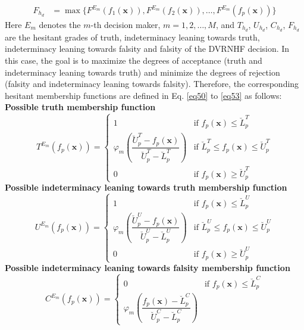 \documentclass[a4paper]{elsarticle}
\begin{document}
{\begin{align}
\label{eq49}
F_{h_{d}} &= \max\{ F^{E_m}(f_1(\mathbf{x})), F^{E_m}(f_2(\mathbf{x})), \ldots, F^{E_m}(f_p(\mathbf{x})) \}
\end{align}
Here $E_m$ denotes the $m$-th decision maker, $m = 1,2,\ldots,M$, and $T_{h_d}$, $U_{h_d}$, $C_{h_d}$, $F_{h_d}$ are the hesitant grades of truth, indeterminacy leaning towards truth, indeterminacy leaning towards falsity and falsity of the DVRNHF decision. In this case, the goal is to maximize the degrees of acceptance (truth and indeterminacy leaning towards truth) and minimize the degrees of rejection (falsity and indeterminacy leaning towards falsity). Therefore, the corresponding hesitant membership functions are defined in Eq. \ref{eq50} to \ref{eq53}  as follows:\\
\noindent\textbf{Possible truth membership function}
\begin{equation}
\label{eq50}
T^{E_m}(f_p(\mathbf{x})) =
\begin{cases}
1 & \text{if } f_p(\mathbf{x}) \le \breve{L}^{T}_{p}\\[6pt]
\varphi_m\left(\dfrac{\breve{U}^{T}_{p}-f_p(\mathbf{x})}{\breve{U}^{T}_{p}-\breve{L}^{T}_{p}}\right)
& \text{if } \breve{L}^{T}_{p} \le f_p(\mathbf{x}) \le \breve{U}^{T}_{p}\\[10pt]
0 & \text{if } f_p(\mathbf{x}) \ge \breve{U}^{T}_{p}
\end{cases}
\end{equation}
\noindent\textbf{Possible indeterminacy leaning towards truth membership function}
\begin{equation}
\label{eq51}
U^{E_m}(f_p(\mathbf{x})) =
\begin{cases}
1 & \text{if } f_p(\mathbf{x}) \le \breve{L}^{U}_{p}\\[6pt]
\varphi_m\left(\dfrac{\breve{U}^{U}_{p}-f_p(\mathbf{x})}{\breve{U}^{U}_{p}-\breve{L}^{U}_{p}}\right)
& \text{if } \breve{L}^{U}_{p} \le f_p(\mathbf{x}) \le \breve{U}^{U}_{p}\\[10pt]
0 & \text{if } f_p(\mathbf{x}) \ge \breve{U}^{U}_{p}
\end{cases}
\end{equation}
\noindent\textbf{Possible indeterminacy leaning towards falsity membership function}
\begin{equation}
\label{eq52}
C^{E_m}(f_p(\mathbf{x})) =
\begin{cases}
0 & \text{if } f_p(\mathbf{x}) \le \breve{L}^{C}_{p}\\[6pt]
\varphi_m\left(\dfrac{f_p(\mathbf{x})-\breve{L}^{C}_{p}}{\breve{U}^{C}_{p}-\breve{L}^{C}_{p}}\right)

\end{cases}
\end{equation}}
\end{document}
